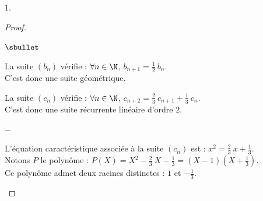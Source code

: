 \documentclass[11pt]{article}%
\begin{document}
\begin{noliste}{1.}
\begin{proof}
\begin{noliste}{$\sbullet$}


    \item La suite $(b_n)$ vérifie : $\forall n \in \N$, $b_{n+1} =
      \frac{1}{2} \ b_n$.\\[.1cm]
      C'est donc une suite géométrique.%

    \item La suite $(c_n)$ vérifie : $\forall n \in \N$, $c_{n+2} =
      \frac{2}{3} \ c_{n+1} + \frac{1}{3} \ c_n$.\\[.1cm]
      C'est donc une suite récurrente linéaire d'ordre $2$.
      \begin{noliste}{$-$}
      \item L'équation caractéristique associée à la suite $(c_n)$ est
        : $x^2 = \frac{2}{3} \ x + \frac{1}{3}$.\\[.1cm]
        Notons $P$ le polynôme : $P(X) = X^2 - \frac{2}{3} \ X -
        \frac{1}{3} = (X - 1)(X + \frac{1}{3})$.\\[.1cm]
        Ce polynôme admet deux racines distinctes : $1$ et
        $-\frac{1}{3}$.


\end{noliste}
\end{noliste}
\end{proof}
\end{noliste}
\end{document}
